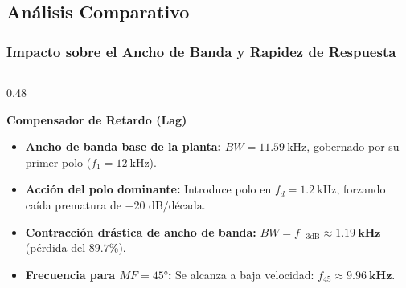 \documentclass[aspectratio=169, 10pt]{beamer}
\begin{document}
\subsection{Análisis Comparativo}
\begin{frame}
  \frametitle{Impacto sobre el Ancho de Banda y Rapidez de Respuesta}

  \begin{columns}[t, onlytextwidth]
    \begin{column}{0.48\textwidth}
      \begin{tarjeta}
        {\fontsize{9pt}{11pt}\selectfont \textbf{\color{NavyDark} Compensador de Retardo (Lag)}}\\[2pt]
        {\fontsize{8pt}{10pt}\selectfont
        \begin{itemize}\setlength{\itemsep}{2.5pt}
          \item \textbf{Ancho de banda base de la planta:}
          $BW = \qty{11.59}{\kilo\hertz}$, gobernado por su primer polo ($f_1 = \qty{12}{\kilo\hertz}$).
          \item \textbf{Acción del polo dominante:}
          Introduce polo en $f_d = \qty{1.2}{\kilo\hertz}$, forzando caída prematura de $-20\text{ dB/década}$.
          \item \textbf{Contracción drástica de ancho de banda:}
          $BW = f_{-3\text{dB}} \approx \mathbf{\qty{1.19}{\kilo\hertz}}$ (pérdida del $\mathbf{89.7\%}$).
          \item \textbf{Frecuencia para $MF = \ang{45}$:}
          Se alcanza a baja velocidad: $f_{45} \approx \mathbf{\qty{9.96}{\kilo\hertz}}$.
        \end{itemize}
        }
      \end{tarjeta}
    \end{column}


\end{columns}
\end{frame}
\end{document}
